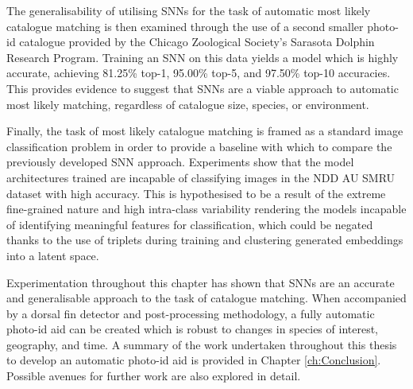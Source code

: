 The generalisability of utilising SNNs for the task of automatic most likely catalogue matching is then examined through the use of a second smaller photo-id catalogue provided by the Chicago Zoological Society's Sarasota Dolphin Research Program. Training an SNN on this data yields a model which is highly accurate, achieving 81.25\% top-1, 95.00\% top-5, and 97.50\% top-10 accuracies. This provides evidence to suggest that SNNs are a viable approach to automatic most likely matching, regardless of catalogue size, species, or environment.

Finally, the task of most likely catalogue matching is framed as a standard image classification problem in order to provide a baseline with which to compare the previously developed SNN approach. Experiments show that the model architectures trained are incapable of classifying images in the NDD AU SMRU dataset with high accuracy. This is hypothesised to be a result of the extreme fine-grained nature and high intra-class variability rendering the models incapable of identifying meaningful features for classification, which could be negated thanks to the use of triplets during training and clustering generated embeddings into a latent space.

Experimentation throughout this chapter has shown that SNNs are an accurate and generalisable approach to the task of catalogue matching. When accompanied by a dorsal fin detector and post-processing methodology, a fully automatic photo-id aid can be created which is robust to changes in species of interest, geography, and time. A summary of the work undertaken throughout this thesis to develop an automatic photo-id aid is provided in Chapter \ref{ch:Conclusion}. Possible avenues for further work are also explored in detail.
